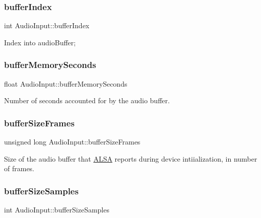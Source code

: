 \subsubsection{\texorpdfstring{buffer\+Index}{bufferIndex}}
{\ttfamily int Audio\+Input\+::buffer\+Index\hspace{0.3cm}{\ttfamily [protected]}}

Index into audio\+Buffer; \hypertarget{classAudioInput_aea3145ccca0f7cebf36a78278ca44031}{}\label{classAudioInput_aea3145ccca0f7cebf36a78278ca44031} 
\subsubsection{\texorpdfstring{buffer\+Memory\+Seconds}{bufferMemorySeconds}}
{\ttfamily float Audio\+Input\+::buffer\+Memory\+Seconds\hspace{0.3cm}{\ttfamily [protected]}}

Number of seconds accounted for by the audio buffer. \hypertarget{classAudioInput_adb734d274b7ce2967b74e2280ff6d487}{}\label{classAudioInput_adb734d274b7ce2967b74e2280ff6d487} 
\subsubsection{\texorpdfstring{buffer\+Size\+Frames}{bufferSizeFrames}}
{\ttfamily unsigned long Audio\+Input\+::buffer\+Size\+Frames\hspace{0.3cm}{\ttfamily [protected]}}

Size of the audio buffer that \hyperlink{classALSA}{A\+L\+SA} reports during device intiialization, in number of frames. \hypertarget{classAudioInput_a4e213a9a22a62dccc3a54369101559c7}{}\label{classAudioInput_a4e213a9a22a62dccc3a54369101559c7} 
\subsubsection{\texorpdfstring{buffer\+Size\+Samples}{bufferSizeSamples}}
{\ttfamily int Audio\+Input\+::buffer\+Size\+Samples\hspace{0.3cm}{\ttfamily [protected]}}

